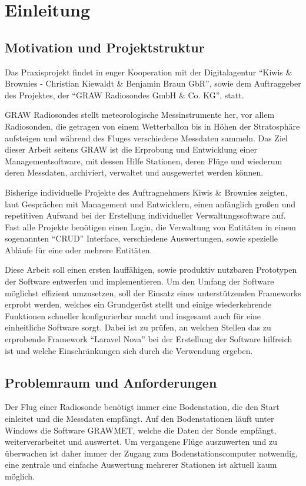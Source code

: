\newpage


\section{Einleitung}

\subsection{Motivation und Projektstruktur}
Das Praxisprojekt findet in enger Kooperation mit der Digitalagentur \enquote{Kiwis \& Brownies - Christian Kiewaldt \& Benjamin Braun GbR}\cite{kiwis}, sowie dem Auftraggeber des Projektes, der \enquote{GRAW Radiosondes GmbH \& Co. KG}\cite{graw}, statt.

GRAW Radiosondes stellt meteorologische Messinstrumente her, vor allem Radiosonden, die getragen von einem Wetterballon bis in Höhen der Stratosphäre aufsteigen und während des Fluges verschiedene Messdaten sammeln.
Das Ziel dieser Arbeit seitens GRAW ist die Erprobung und Entwicklung einer Managementsoftware, mit dessen Hilfe Stationen, deren Flüge und wiederum deren Messdaten, archiviert, verwaltet und ausgewertet werden können.

Bisherige individuelle Projekte des Auftragnehmers Kiwis \& Brownies zeigten, laut Gesprächen mit Management und Entwicklern, einen anfänglich großen und repetitiven Aufwand bei der Erstellung individueller Verwaltungssoftware auf.
Fast alle Projekte benötigen einen Login, die Verwaltung von Entitäten in einem sogenannten \enquote{CRUD}\cite{crud} Interface, verschiedene Auswertungen, sowie spezielle Abläufe für eine oder mehrere Entitäten.

Diese Arbeit soll einen ersten lauffähigen, sowie produktiv nutzbaren Prototypen der Software entwerfen und implementieren.
Um den Umfang der Software möglichst effizient umzusetzen, soll der Einsatz eines unterstützenden Frameworks erprobt werden, welches ein Grundgerüst stellt und einige wiederkehrende Funktionen schneller konfigurierbar macht und insgesamt auch für eine einheitliche Software sorgt.
Dabei ist zu prüfen, an welchen Stellen das zu erprobende Framework \enquote{Laravel Nova}\cite{laravel-nova} bei der Erstellung der Software hilfreich ist und welche Einschränkungen sich durch die Verwendung ergeben.

\subsection{Problemraum und Anforderungen}
Der Flug einer Radiosonde benötigt immer eine Bodenstation, die den Start einleitet und die Messdaten empfängt.
Auf den Bodenstationen läuft unter Windows die Software GRAWMET, welche die Daten der Sonde empfängt, weiterverarbeitet und auswertet.
Um vergangene Flüge auszuwerten und zu überwachen ist daher immer der Zugang zum Bodenstationscomputer notwendig, eine zentrale und einfache Auswertung mehrerer Stationen ist aktuell kaum möglich.

